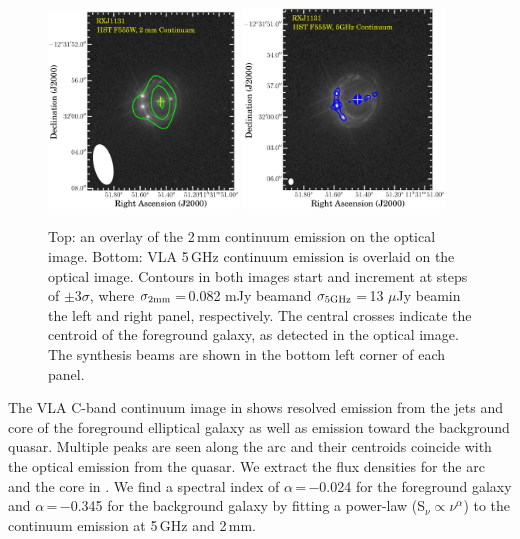 \documentclass[]{emulateapj}
\begin{document}
\begin{figure}[!htbp]
\includegraphics[trim=12 27 0 0, clip, width=0.45\textwidth]{../Figures/F555W_ContPdBI.eps}
\includegraphics[trim=10 5 0 0, clip, width=0.475\textwidth]{../Figures/F555W_ContVLA.eps}
\caption{Top: an overlay of the 2\,mm continuum emission on the optical image.
Bottom: VLA 5\,GHz continuum emission is overlaid on the optical image.
Contours in both images start and increment at steps of
$\pm$3$\sigma$, where $\sigma_{\rm 2mm}$\,=\,0.082 mJy beam\pmOne and
$\sigma_{\rm 5GHz}$\,=\,13 $\mu$Jy beam\pmOne in the left and right panel, respectively.
The central crosses indicate the centroid of the foreground galaxy,
as detected in the optical image. The synthesis beams are shown in the bottom left corner of each panel.
\label{fig:cont}}\vspace{0.51em}
\end{figure}

The VLA C-band continuum image in  shows resolved emission from the
jets and core of the foreground elliptical galaxy
as well as emission toward the background quasar.
Multiple peaks are seen along the arc and their centroids
coincide with the optical emission from the quasar.
We extract the flux densities for the arc and the core in .
We find a spectral index of $\alpha$\,=\,$-$0.024 for the foreground
galaxy and $\alpha$\,=\,$-$0.345 for the background galaxy by fitting a
power-law (S$_\nu \propto \nu^{\alpha}$) to the continuum emission at
5\,GHz and 2\,mm.
\end{document}
